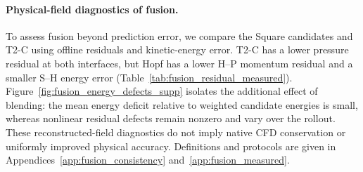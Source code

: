 \paragraph{Physical-field diagnostics of fusion.}
To assess fusion beyond prediction error, we compare the Square
candidates and T2-C using offline residuals and kinetic-energy error.
T2-C has a lower pressure residual at both interfaces, but Hopf has
a lower H--P momentum residual and a smaller S--H energy error
(Table~\ref{tab:fusion_residual_measured}).
Figure~\ref{fig:fusion_energy_defects_supp} isolates the additional
effect of blending: the mean energy deficit relative to weighted
candidate energies is small, whereas nonlinear residual defects remain
nonzero and vary over the rollout.
These reconstructed-field diagnostics do not imply native CFD
conservation or uniformly improved physical accuracy.
Definitions and protocols are given in
Appendices~\ref{app:fusion_consistency} and~\ref{app:fusion_measured}.
